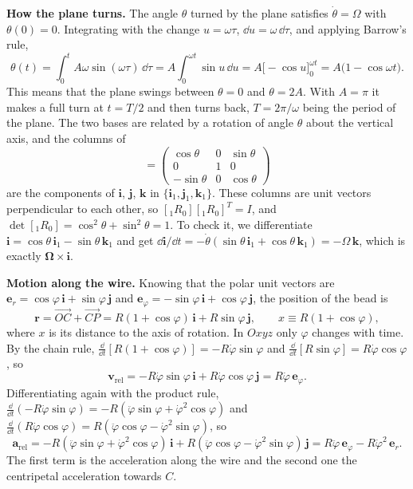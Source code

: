 \documentclass[11pt,a4paper]{article}
\newcommand{\dt}[1]{\dot{#1}}
\newcommand{\ddt}[1]{\ddot{#1}}
\newcommand{\er}{\bm{e}_r}
\newcommand{\ephi}{\bm{e}_\varphi}
\newcommand{\ii}{\bm{i}}
\newcommand{\jj}{\bm{j}}
\newcommand{\kk}{\bm{k}}
\begin{document}
\textbf{How the plane turns.} The angle $\theta$ turned by the plane satisfies $\dt\theta=\Omega$ with $\theta(0)=0$. Integrating with the change $u=\omega\tau$, $\dd u=\omega\,\dd\tau$, and applying Barrow's rule,
\begin{equation}
\theta(t)=\int_0^t A\omega\sin(\omega\tau)\,\dd\tau=A\int_0^{\omega t}\sin u\,\dd u=A\big[-\cos u\big]_0^{\omega t}=A\big(1-\cos\omega t\big).
\label{eq:theta}
\end{equation}
This means that the plane swings between $\theta=0$ and $\theta=2A$. With $A=\pi$ it makes a full turn at $t=T/2$ and then turns back, $T=2\pi/\omega$ being the period of the plane. The two bases are related by a rotation of angle $\theta$ about the vertical axis, and the columns of
\begin{equation}
[{}_1R_0]=\begin{pmatrix}\cos\theta&0&\sin\theta\\0&1&0\\-\sin\theta&0&\cos\theta\end{pmatrix}
\label{eq:rot}
\end{equation}
are the components of $\ii$, $\jj$, $\kk$ in $\{\ii_1,\jj_1,\kk_1\}$. These columns are unit vectors perpendicular to each other, so $[{}_1R_0][{}_1R_0]^T=I$, and $\det[{}_1R_0]=\cos^2\theta+\sin^2\theta=1$. To check it, we differentiate $\ii=\cos\theta\,\ii_1-\sin\theta\,\kk_1$ and get $\dd\ii/\dd t=-\dt\theta(\sin\theta\,\ii_1+\cos\theta\,\kk_1)=-\Omega\,\kk$, which is exactly $\bm\Omega\times\ii$.

\textbf{Motion along the wire.} Knowing that the polar unit vectors are $\er=\cos\varphi\,\ii+\sin\varphi\,\jj$ and $\ephi=-\sin\varphi\,\ii+\cos\varphi\,\jj$, the position of the bead is
\begin{equation}
\bm r=\overrightarrow{OC}+\overrightarrow{CP}=R(1+\cos\varphi)\,\ii+R\sin\varphi\,\jj,\qquad x\equiv R(1+\cos\varphi),
\label{eq:pos}
\end{equation}
where $x$ is its distance to the axis of rotation. In $Oxyz$ only $\varphi$ changes with time. By the chain rule, $\frac{\dd}{\dd t}[R(1+\cos\varphi)]=-R\dt\varphi\sin\varphi$ and $\frac{\dd}{\dd t}[R\sin\varphi]=R\dt\varphi\cos\varphi$, so
\begin{equation}
\bm v_{\text{rel}}=-R\dt\varphi\sin\varphi\,\ii+R\dt\varphi\cos\varphi\,\jj=R\dt\varphi\,\ephi .
\label{eq:vrel}
\end{equation}
Differentiating again with the product rule, $\frac{\dd}{\dd t}(-R\dt\varphi\sin\varphi)=-R(\ddt\varphi\sin\varphi+\dt\varphi^2\cos\varphi)$ and $\frac{\dd}{\dd t}(R\dt\varphi\cos\varphi)=R(\ddt\varphi\cos\varphi-\dt\varphi^2\sin\varphi)$, so
\begin{equation}
\bm a_{\text{rel}}=-R(\ddt\varphi\sin\varphi+\dt\varphi^2\cos\varphi)\,\ii+R(\ddt\varphi\cos\varphi-\dt\varphi^2\sin\varphi)\,\jj=R\ddt\varphi\,\ephi-R\dt\varphi^2\,\er .
\label{eq:arel}
\end{equation}
The first term is the acceleration along the wire and the second one the centripetal acceleration towards $C$.
\end{document}
